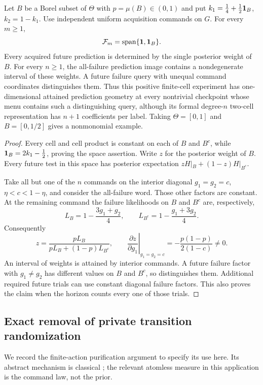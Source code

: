 \begin{proposition}
\label{prop:v34-two-cell}
Let $B$ be a Borel subset of $\Theta$ with $p=\mu(B)\in(0,1)$ and
put $k_1=\tfrac14+\tfrac12\mathbf 1_B$, $k_2=1-k_1$. Use independent
uniform acquisition commands on $G$. For every $m\ge1$,
\[
            \mathcal F_m=\operatorname{span}\{\mathbf 1,\mathbf 1_B\}.
\]
Every acquired future prediction is determined by the single posterior
weight of $B$. For every $n\ge1$, the all-failure prediction image
contains a nondegenerate interval of these weights. A future failure
query with unequal command coordinates distinguishes them. Thus this
positive finite-cell experiment has one-dimensional attained
prediction geometry at every nontrivial checkpoint whose menu contains
such a distinguishing query, although its
formal degree-$n$ two-cell representation has $n+1$ coefficients
per label. Taking $\Theta=[0,1]$ and $B=[0,1/2]$ gives a
nonmonomial example.
\end{proposition}
\begin{proof}
Every cell and cell product is constant on each of $B$ and $B^c$,
while $\mathbf 1_B=2k_1-\tfrac12$, proving the space assertion. Write
$z$ for the posterior weight of $B$. Every future test in this space
has posterior expectation $zH|_B+(1-z)H|_{B^c}$.

Take all but one of the $n$ commands on the interior diagonal
$g_1=g_2=c$, $\eta<c<1-\eta$, and consider the all-failure word.
Those other factors are constant. At the remaining command the
failure likelihoods on $B$ and $B^c$ are, respectively,
\[
 L_B=1-\frac{3g_1+g_2}{4},\qquad
 L_{B^c}=1-\frac{g_1+3g_2}{4}.
\]
Consequently
\[
 z=\frac{pL_B}{pL_B+(1-p)L_{B^c}},\qquad
 \left.\frac{\partial z}{\partial g_1}\right|_{g_1=g_2=c}
       =-\frac{p(1-p)}{2(1-c)}\ne0.
\]
An interval of weights is attained by interior commands. A future
failure factor with $g_1\ne g_2$ has different values on $B$ and
$B^c$, so distinguishes them. Additional required future trials can
use constant diagonal failure factors. This also proves the claim
when the horizon counts every one of those trials.
\end{proof}

\subsection{Exact removal of private transition randomization}
We record the finite-action purification argument to specify its use
here. Its abstract mechanism is classical \cite{DWW1951}; the relevant
atomless measure in this application is the command law, not the prior.

